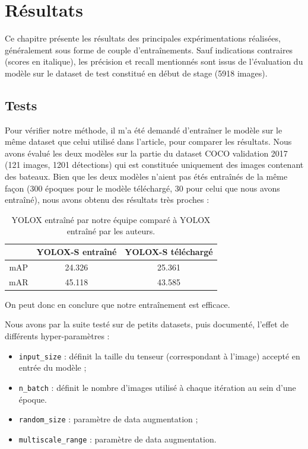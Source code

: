 \chapter{Résultats}\label{resultats}

Ce chapitre présente les résultats des principales expérimentations réalisées, généralement sous forme de couple d'entraînements. Sauf indications contraires (scores en italique), les précision et recall mentionnés sont issus de l'évaluation du modèle sur le dataset de test constitué en début de stage (5918 images).

\section{Tests}

Pour vérifier notre méthode, il m'a été demandé d'entraîner le modèle sur le même dataset que celui utilisé
dans l'article, pour comparer les résultats. Nous avons évalué les deux modèles sur la partie du dataset
COCO validation 2017 (121 images, 1201 détections) qui est constituée uniquement des images
contenant des bateaux.
Bien que les deux modèles n'aient pas étés entraînés de la même façon (300 époques pour le modèle téléchargé,
30 pour celui que nous avons entraîné), nous avons obtenu des résultats très proches :

\begin{table}[!h]
    \caption{YOLOX entraîné par notre équipe comparé à YOLOX entraîné par les auteurs.}
\begin{center}
    \begin{tabular}{ c c c }
        \hline
        & YOLOX-S entraîné & YOLOX-S téléchargé \\
        \hline
        mAP & 24.326 & 25.361 \\
        mAR & 45.118 & 43.585
    \end{tabular}
\end{center}
\end{table}

On peut donc en conclure que notre entraînement est efficace.

Nous avons par la suite testé sur de petits datasets, puis documenté,
l'effet de différents hyper-paramètres :

\begin{itemize}
    \item \texttt{input\_size} : définit la taille du tenseur (correspondant à l'image) accepté en entrée du modèle ;
    \item \texttt{n\_batch} : définit le nombre d'images utilisé à chaque itération au sein d'une époque.
    \item \texttt{random\_size} : paramètre de data augmentation ;
    \item \texttt{multiscale\_range} : paramètre de data augmentation.
\end{itemize}

